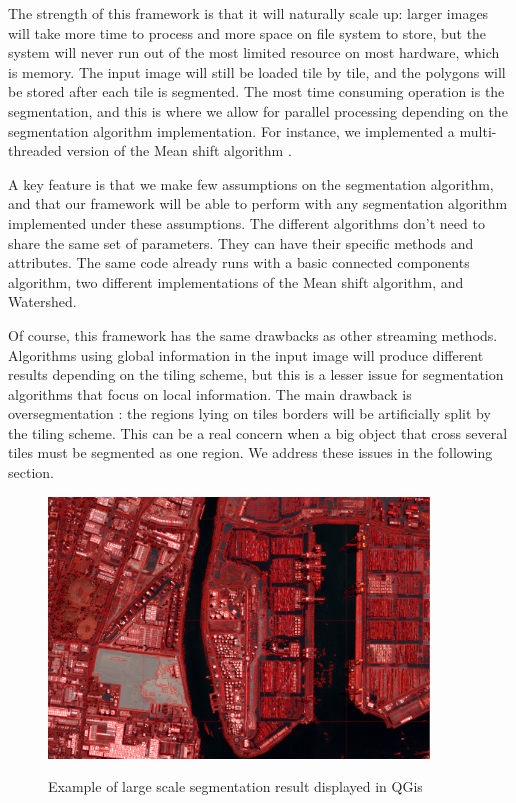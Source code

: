 \documentclass{josis}
\begin{document}
The strength of this framework is that it will naturally scale up:
larger images will take more time to process and more space on file
system to store, but the system will never run out of the most limited
resource on most hardware, which is memory. The input image will still be 
loaded tile by tile, and the polygons will be stored after each tile is 
segmented. The most time consuming
operation is the segmentation, and this is where we allow for parallel
processing depending on the segmentation algorithm implementation. For
instance, we implemented a multi-threaded version of the Mean shift
algorithm \cite{Comaniciu2002mean}.
 
A key feature is that we make few assumptions on the segmentation
algorithm, and that our framework will be able to perform with any
segmentation algorithm implemented under these assumptions. The 
different algorithms don't need to share the same set of parameters. They 
can have their specific methods and attributes. The same
code already runs with a basic connected components algorithm, two
different implementations of the Mean shift algorithm, and Watershed.

Of course, this framework has the same drawbacks as other streaming
methods. Algorithms using global information in the input image will 
produce different results depending on the tiling scheme, but this is
a lesser issue for segmentation algorithms that focus on local information. 
The main drawback is oversegmentation : the regions lying on tiles borders 
will be artificially split by the tiling scheme. This can be a real concern 
when a big object that cross several tiles must be segmented as one region.  
We address these issues in the following section.

\begin{figure}[!htb]
\centering
\includegraphics[width=0.9\textwidth]{Pictures/ogrs_nostitch.png}\label{fig:nostitch}
\caption{Example of large scale segmentation result displayed in QGis}
\end{figure}
\end{document}
